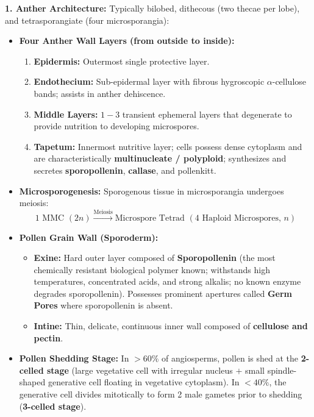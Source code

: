 \documentclass[10pt,twoside,openright]{book}
\begin{document}
\begin{conceptbox}
\textbf{1. Anther Architecture:}
Typically bilobed, dithecous (two thecae per lobe), and tetrasporangiate (four microsporangia):
\begin{itemize}[leftmargin=*]
  \item \textbf{Four Anther Wall Layers (from outside to inside):}
  \begin{enumerate}
    \item \textbf{Epidermis:} Outermost single protective layer.
    \item \textbf{Endothecium:} Sub-epidermal layer with fibrous hygroscopic $\alpha$-cellulose bands; assists in anther dehiscence.
    \item \textbf{Middle Layers:} $1-3$ transient ephemeral layers that degenerate to provide nutrition to developing microspores.
    \item \textbf{Tapetum:} Innermost nutritive layer; cells possess dense cytoplasm and are characteristically \textbf{multinucleate / polyploid}; synthesizes and secretes \textbf{sporopollenin}, \textbf{callase}, and pollenkitt.
  \end{enumerate}
  \item \textbf{Microsporogenesis:} Sporogenous tissue in microsporangia undergoes meiosis:
  \[
    \text{1 MMC }(2n) \xrightarrow{\text{Meiosis}} \text{Microspore Tetrad }(4\text{ Haploid Microspores, } n)
  \]
  \item \textbf{Pollen Grain Wall (Sporoderm):}
  \begin{itemize}
    \item \textbf{Exine:} Hard outer layer composed of \textbf{Sporopollenin} (the most chemically resistant biological polymer known; withstands high temperatures, concentrated acids, and strong alkalis; no known enzyme degrades sporopollenin). Possesses prominent apertures called \textbf{Germ Pores} where sporopollenin is absent.
    \item \textbf{Intine:} Thin, delicate, continuous inner wall composed of \textbf{cellulose and pectin}.
  \end{itemize}
  \item \textbf{Pollen Shedding Stage:} In $>60\%$ of angiosperms, pollen is shed at the \textbf{2-celled stage} (large vegetative cell with irregular nucleus $+$ small spindle-shaped generative cell floating in vegetative cytoplasm). In $<40\%$, the generative cell divides mitotically to form 2 male gametes prior to shedding (\textbf{3-celled stage}).
\end{itemize}
\end{conceptbox}
\end{document}

